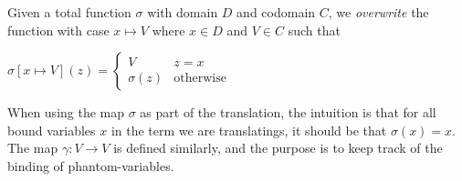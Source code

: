 \documentclass[a4paper,UKenglish,cleveref, autoref]{lipics-v2019}
\newtheorem{notation}[definition]{Notation}
\newcommand{\set}[1]{ \{ #1 \} }
\begin{document}
\begin{definition}
Given a total function $\sigma$ with domain $D$ and codomain $C$, we \emph{overwrite} the function with case $x \mapsto V$ where $x \in D$ and $V \in C$ such that

$\sigma [ x \mapsto V ] (z) = \begin{cases} V & z = x \\ \sigma(z) & \text{otherwise}  \end{cases}$
\end{definition}

%
%

When using the map $\sigma$ as part of the translation, the intuition is that for all bound variables $x$ in the term we are translatings, it should be that $\sigma(x) = x$. The map $\gamma : V \rightarrow V$ is defined similarly, and the purpose is to keep track of the binding of phantom-variables.
\end{document}
